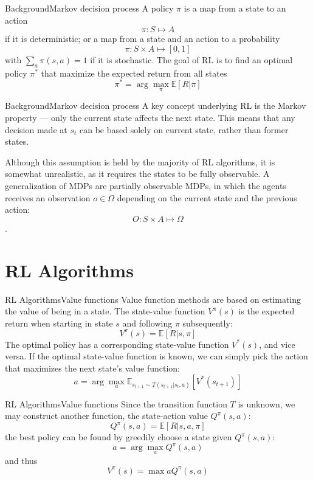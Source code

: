 \documentclass{beamer}
\begin{document}
  \begin{frame}{Background}{Markov decision process}
    A policy $\pi$ is a map from a state to an action
    $$ \pi: S \mapsto A $$
    if it is deterministic; or a map from a state and an action to a probability
    $$ \pi: S \times A \mapsto [0, 1] $$
    with $\sum_{a}\pi(s, a) = 1$ if it is stochastic. The goal of RL is to find an optimal policy $\pi^*$ that maximize the expected return from all states
    $$ \pi^* = \arg\max_{\pi} \mathbb{E}[R|\pi] $$
  \end{frame}
  
  \begin{frame}{Background}{Markov decision process}
    A key concept underlying RL is the Markov property --- only the current state affects the next state. This means that any decision made at $s_t$ can be based solely on current state, rather than former states. \par
    \pause
    Although this assumption is held by the majority of RL algorithms, it is somewhat unrealistic, as it requires the states to be fully observable. A generalization of MDPs are partially observable MDPs, in which the agents receives an observation $o \in \Omega$ depending on the current state and the previous action:
   $$O: S \times A \mapsto \Omega$$.
  \end{frame}

  \section{RL Algorithms}
  \begin{frame}{RL Algorithms}{Value functions}
  Value function methods are based on estimating the value of being in a state. The state-value function $V^{\pi}(s)$ is the expected return when starting in state $s$ and following $\pi$ subsequently:
  $$V^{\pi}(s) = \mathbb{E}[R|s, \pi]$$
  The optimal policy has a corresponding state-value function $V^{*}(s)$, and vice versa. If the optimal state-value function is known, we can simply pick the action that maximizes the next state's value function:
 $$ a = \arg\max_{a} \mathbb{E}_{s_{t+1} \sim T(s_{t+1}|s_t, a)} [V^*(s_{t+1})]$$
  \end{frame}

  \begin{frame}{RL Algorithms}{Value functions}
  Since the transition function $T$ is unknown, we may construct another function, the state-action value $Q^{\pi}(s, a)$:
  $$ Q^{\pi}(s, a) = \mathbb{E}[R|s, a, \pi] $$
  the best policy can be found by greedily choose a state given $Q^{\pi}(s,a)$:
  $$ a = \arg\max_{a} Q^{\pi}(s, a) $$
  and thus
  $$ V^{\pi}(s) = \max{a} Q^{\pi}(s, a) $$
  \end{frame}
\end{document}
